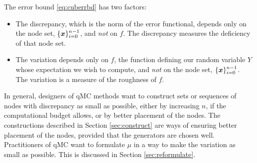\documentclass{svproc}
\begin{document}
The error bound \eqref{eq:cuberrbd} has two factors:
\begin{itemize}
	\item The discrepancy, which is the norm of the error functional, depends only on the node set, $\{{\boldsymbol{x}}\}_{i=0}^{n-1}$, and \emph{not} on $f$.  The discrepancy measures the deficiency of that node set.
	\item The variation depends only on $f$, the function defining our random variable $Y$ whose expectation we wish to compute,  and \emph{not} on the node set, $\{{\boldsymbol{x}}\}_{i=0}^{n-1}$.  The variation is a measure of the roughness of $f$.
\end{itemize}
In general, designers of qMC methods want to construct sets or sequences of nodes with  discrepancy as small as possible, either by increasing $n$, if the computational budget allows, or by better placement of the nodes.  The constructions described in Section \ref{sec:construct} are ways of ensuring better placement of the nodes, provided that the generators are chosen well.  Practitioners of qMC want to formulate $\mu$ in a way to make the variation as small as possible.  This is discussed in Section \ref{sec:reformulate}.
\end{document}
